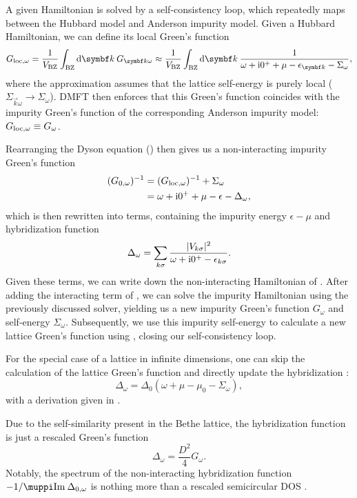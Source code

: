 A given Hamiltonian is solved by a self-consistency loop,
which repeatedly maps between the Hubbard model and Anderson impurity model.
Given a Hubbard Hamiltonian, we can define its local Green's function
\begin{equation}
    G_{\mloc,\omega}
    =
    \frac{1}{V_\mBZ} \int_\mBZ \md\vec{k}\> G_{\vec{k}\omega}
    \approx
    \frac{1}{V_\mBZ} \int_\mBZ \md\vec{k}\> \frac{1}{\omega + \mi0^+ + \mu - \epsilon_{\vec{k}} - \Sigma_\omega},
    \label{eq:greens-function-local}
\end{equation}
where the approximation assumes that the lattice self-energy is purely local
($\Sigma_{\vec{k}\omega} \to \Sigma_\omega$).
DMFT then enforces that this Green's function coincides with the impurity Green's function
of the corresponding Anderson impurity model: $G_{\mathrm{loc},\omega} \equiv G_\omega$.

Rearranging the Dyson equation () then gives us a non-interacting impurity
Green's function
\begin{align}
    (G_{0,\omega})^{-1}
     & =
    (G_{\mathrm{loc},\omega})^{-1} + \Sigma_\omega \\
     & =
    \omega + \mathrm{i}0^+ + \mu - \epsilon - \Delta_\omega,
\end{align}
which is then rewritten into terms,
containing the impurity energy $\epsilon - \mu$ and hybridization function
\begin{equation}
    \Delta_\omega = \sum_{k\sigma} \frac{\lvert V_{k\sigma}\rvert^2}{\omega +\mathrm{i}0^+ - \epsilon_{k\sigma}}.
\end{equation}
Given these terms, we can write down the non-interacting Hamiltonian
of .
After adding the interacting term of , we can solve the impurity
Hamiltonian using the previously discussed solver,
yielding us a new impurity Green's function $G_\omega$
and self-energy $\Sigma_\omega$.
Subsequently, we use this impurity self-energy to
calculate a new lattice Green's function using ,
closing our self-consistency loop.

For the special case of a lattice in infinite dimensions,
one can skip the calculation of the lattice Green's function
and directly update the hybridization \cite{Lu2014}:
\begin{equation}
    \Delta_\omega = \Delta_{0}(\omega + \mu - \mu_0 - \Sigma_\omega),
\end{equation}
with a derivation given in .

Due to the self-similarity present in the Bethe lattice,
the hybridization function is just a rescaled Green's function
\begin{equation}
    \Delta_\omega = \frac{D^2}{4} G_\omega.
\end{equation}
Notably,
the spectrum of the non-interacting hybridization function $-1/\muppi \Im \Delta_{0,\omega}$
is nothing more than a rescaled semicircular DOS .
